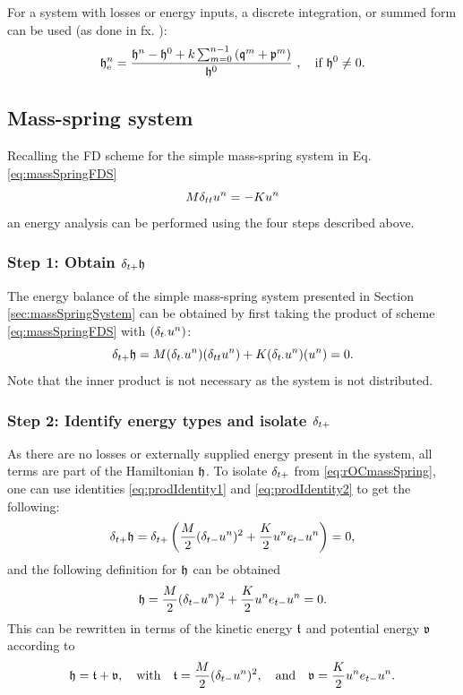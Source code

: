 {{For a system with losses or energy inputs, a discrete integration, or summed form can be used (as done in fx. \cite{Harrison2018}):
\begin{equation}\label{eq:normalisedEnergyDamping}
    \h_{\text{e}}^n = \frac{\h^n-\h^0 + k\sum_{m = 0}^{n-1} \left(\mathfrak{q}^m + \mathfrak{p}^m\right)}{\h^0}\ ,\quad \text{if}\ \h^0\neq 0.
\end{equation}

\subsection{Mass-spring system}
Recalling the FD scheme for the simple mass-spring system in Eq. \eqref{eq:massSpringFDS}
\begin{equation*}
    M\delta_{tt} u^n = -Ku^n
\end{equation*}
an energy analysis can be performed using the four steps described above. 

\subsubsection{Step 1: Obtain $\delta_{t+} \mathfrak{h}$}
The energy balance of the simple mass-spring system presented in Section \ref{sec:massSpringSystem} can be obtained by first taking the product of scheme \eqref{eq:massSpringFDS} with $(\delta_{t\cdot} u^n)$:
\begin{equation}\label{eq:rOCmassSpring}
    \delta_{t+} \mathfrak{h} = M(\delta_{t\cdot}u^n)(\delta_{tt} u^n) + K(\delta_{t\cdot}u^n)(u^n) = 0.
\end{equation}
Note that the inner product is not necessary as the system is not distributed.

\subsubsection{Step 2: Identify energy types and isolate $\delta_{t+}$}
As there are no losses or externally supplied energy present in the system, all terms are part of the Hamiltonian $\mathfrak{h}$. To isolate $\delta_{t+}$ from \eqref{eq:rOCmassSpring}, one can use identities \eqref{eq:prodIdentity1} and \eqref{eq:prodIdentity2} to get the following:
\begin{equation}
    \delta_{t+} \mathfrak{h} = \delta_{t+}\left(\frac{M}{2}(\delta_{t-}u^n)^2 + \frac{K}{2}u^n e_{t-}u^n\right) = 0,
\end{equation}
and the following definition for $\mathfrak{h}$ can be obtained
\begin{equation}
    \mathfrak{h} = \frac{M}{2}(\delta_{t-}u^n)^2 + \frac{K}{2}u^n e_{t-}u^n = 0.
\end{equation}
This can be rewritten in terms of the kinetic energy $\mathfrak{t}$ and potential energy $\mathfrak{v}$ according to
\begin{equation}\label{eq:energyBalanceMassSpring}
    \mathfrak{h} = \mathfrak{t} + \mathfrak{v}, \quad \text{with} \quad
    \mathfrak{t} = \frac{M}{2}(\delta_{t-}u^n)^2, \quad \text{and} \quad \mathfrak{v} = \frac{K}{2}u^n e_{t-}u^n.
\end{equation} 

}}
